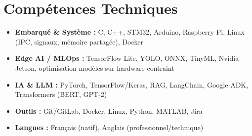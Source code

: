 \documentclass[a4paper,11pt]{article}
\begin{document}
\section{Compétences Techniques}
\begin{itemize}[leftmargin=*, nosep]
    \item \small{\textbf{Embarqué \& Système :} C, C++, STM32, Arduino, Raspberry Pi, Linux (IPC, signaux, mémoire partagée), Docker}
    \item \small{\textbf{Edge AI / MLOps :} TensorFlow Lite, YOLO, ONNX, TinyML, Nvidia Jetson, optimisation modèles sur hardware contraint}
    \item \small{\textbf{IA \& LLM :} PyTorch, TensorFlow/Keras, RAG, LangChain, Google ADK, Transformers (BERT, GPT-2)}
    \item \small{\textbf{Outils :} Git/GitLab, Docker, Linux, Python, MATLAB, Jira}
    \item \small{\textbf{Langues :} Français (natif), Anglais (professionnel/technique)}
\end{itemize}

\end{document}
